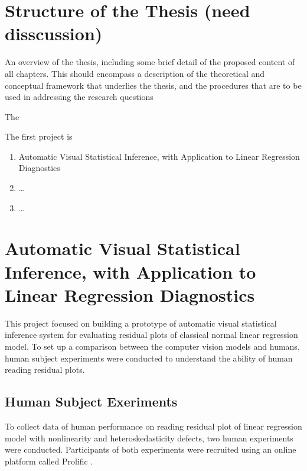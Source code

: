 \documentclass{monashthesis}
\theoremstyle{definition}
\theoremstyle{definition}
\theoremstyle{definition}
\theoremstyle{definition}
\theoremstyle{remark}
\begin{document}
\hypertarget{structure-of-the-thesis-need-disscussion}{%
\chapter{Structure of the Thesis (need disscussion)}\label{structure-of-the-thesis-need-disscussion}}

An overview of the thesis, including some brief detail of the proposed content of all chapters. This should encompass a description of the theoretical and conceptual framework that underlies the thesis, and the procedures that are to be used in addressing the research questions

The

The first project is

\begin{enumerate}
\def\labelenumi{\arabic{enumi}.}
\tightlist
\item
  Automatic Visual Statistical Inference, with Application to Linear Regression Diagnostics
\item
  \ldots{}
\item
  \ldots{}
\end{enumerate}

\hypertarget{automatic-visual-statistical-inference-with-application-to-linear-regression-diagnostics}{%
\chapter{Automatic Visual Statistical Inference, with Application to Linear Regression Diagnostics}\label{automatic-visual-statistical-inference-with-application-to-linear-regression-diagnostics}}

This project focused on building a prototype of automatic visual statistical inference system for evaluating residual plots of classical normal linear regression model. To set up a comparison between the computer vision models and humans, human subject experiments were conducted to understand the ability of human reading residual plots.

\hypertarget{human-subject-exeriments}{%
\section{Human Subject Exeriments}\label{human-subject-exeriments}}

To collect data of human performance on reading residual plot of linear regression model with nonlinearity and heteroskedasticity defects, two human experiments were conducted. Participants of both experiments were recruited using an online platform called Prolific \autocite{prolific_prolific_2022}.
\end{document}

